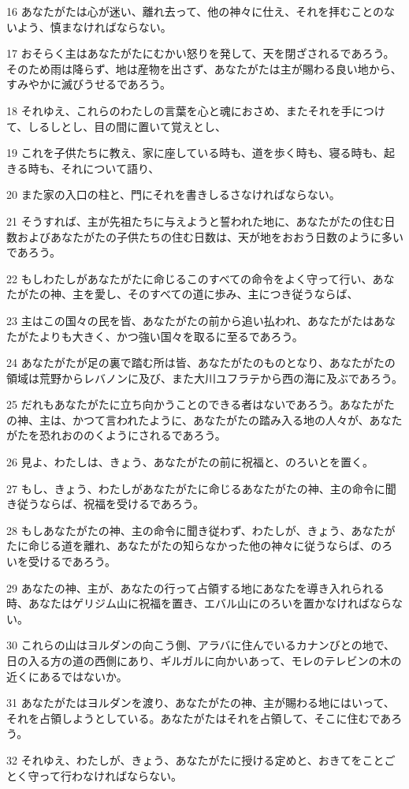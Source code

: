 \par 16 あなたがたは心が迷い、離れ去って、他の神々に仕え、それを拝むことのないよう、慎まなければならない。
\par 17 おそらく主はあなたがたにむかい怒りを発して、天を閉ざされるであろう。そのため雨は降らず、地は産物を出さず、あなたがたは主が賜わる良い地から、すみやかに滅びうせるであろう。
\par 18 それゆえ、これらのわたしの言葉を心と魂におさめ、またそれを手につけて、しるしとし、目の間に置いて覚えとし、
\par 19 これを子供たちに教え、家に座している時も、道を歩く時も、寝る時も、起きる時も、それについて語り、
\par 20 また家の入口の柱と、門にそれを書きしるさなければならない。
\par 21 そうすれば、主が先祖たちに与えようと誓われた地に、あなたがたの住む日数およびあなたがたの子供たちの住む日数は、天が地をおおう日数のように多いであろう。
\par 22 もしわたしがあなたがたに命じるこのすべての命令をよく守って行い、あなたがたの神、主を愛し、そのすべての道に歩み、主につき従うならば、
\par 23 主はこの国々の民を皆、あなたがたの前から追い払われ、あなたがたはあなたがたよりも大きく、かつ強い国々を取るに至るであろう。
\par 24 あなたがたが足の裏で踏む所は皆、あなたがたのものとなり、あなたがたの領域は荒野からレバノンに及び、また大川ユフラテから西の海に及ぶであろう。
\par 25 だれもあなたがたに立ち向かうことのできる者はないであろう。あなたがたの神、主は、かつて言われたように、あなたがたの踏み入る地の人々が、あなたがたを恐れおののくようにされるであろう。
\par 26 見よ、わたしは、きょう、あなたがたの前に祝福と、のろいとを置く。
\par 27 もし、きょう、わたしがあなたがたに命じるあなたがたの神、主の命令に聞き従うならば、祝福を受けるであろう。
\par 28 もしあなたがたの神、主の命令に聞き従わず、わたしが、きょう、あなたがたに命じる道を離れ、あなたがたの知らなかった他の神々に従うならば、のろいを受けるであろう。
\par 29 あなたの神、主が、あなたの行って占領する地にあなたを導き入れられる時、あなたはゲリジム山に祝福を置き、エバル山にのろいを置かなければならない。
\par 30 これらの山はヨルダンの向こう側、アラバに住んでいるカナンびとの地で、日の入る方の道の西側にあり、ギルガルに向かいあって、モレのテレビンの木の近くにあるではないか。
\par 31 あなたがたはヨルダンを渡り、あなたがたの神、主が賜わる地にはいって、それを占領しようとしている。あなたがたはそれを占領して、そこに住むであろう。
\par 32 それゆえ、わたしが、きょう、あなたがたに授ける定めと、おきてをことごとく守って行わなければならない。

